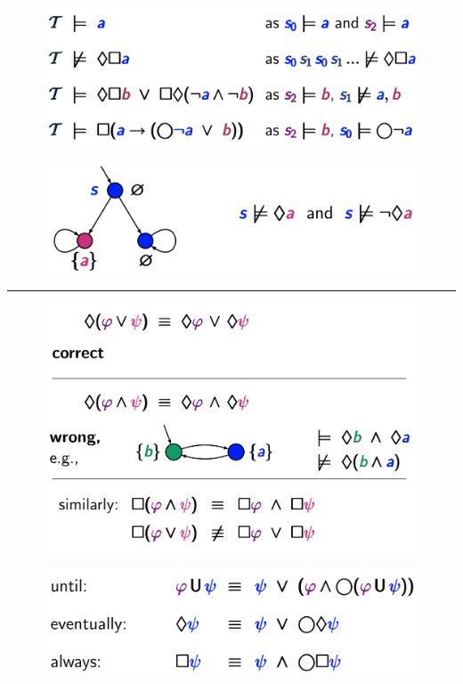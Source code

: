 \documentclass[a4paper, notitlepage, 9pt]{extreport}
\begin{document}
\begin{multicols}{2}
	\begin{figure}[H]
		\centering
		\includegraphics[scale=0.15]{B1}
	\end{figure}
	\columnbreak
	\begin{figure}[H]
		\centering
		\includegraphics[scale=0.2]{B2}
	\end{figure}
\end{multicols}

\hrule

\begin{multicols}{2}
	\begin{figure}[H]
		\centering
		\includegraphics[scale=0.15]{C1}
	\end{figure}
	\columnbreak
	\begin{figure}[H]
		\centering
		\includegraphics[scale=0.2]{C2}
	\end{figure}
\end{multicols}
\end{document}
